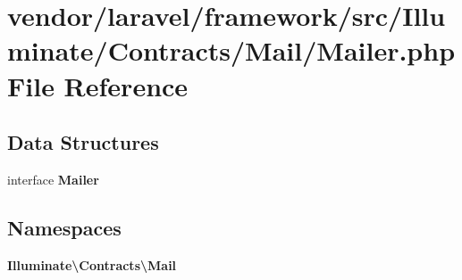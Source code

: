 \section{vendor/laravel/framework/src/\+Illuminate/\+Contracts/\+Mail/\+Mailer.php File Reference}
\label{laravel_2framework_2src_2_illuminate_2_contracts_2_mail_2_mailer_8php}
\subsection*{Data Structures}
\begin{DoxyCompactItemize}
\item 
interface {\bf Mailer}
\end{DoxyCompactItemize}
\subsection*{Namespaces}
\begin{DoxyCompactItemize}
\item 
 {\bf Illuminate\textbackslash{}\+Contracts\textbackslash{}\+Mail}
\end{DoxyCompactItemize}
